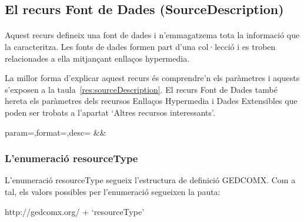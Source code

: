\subsection{El recurs Font de Dades (SourceDescription)}

    \paragraph{}
    Aquest recurs defineix una font de dades i n'emmagatzema tota la informació que la caracteritza. Les fonts de dades formen part d'una col·lecció i es troben relacionades a ella mitjançant enllaços hypermedia.

    La millor forma d'explicar aquest recurs és comprendre'n els paràmetres i aquests s'exposen a la taula~\ref{res:sourceDescription}. El recurs Font de Dades també hereta els paràmetres dels recursos Enllaços Hypermedia i Dades Extensibles que poden ser trobats a l'apartat `Altres recursos interessants'.

    \begin{center}
             {param=\param,format=\format,desc=\desc}
             {\param&\format&\desc}
     \end{center}


    \subsubsection{L'enumeració resourceType}

    L'enumeració resourceType segueix l'estructura de definició GEDCOMX. Com a tal, els valors possibles per l'enumeració segueixen la pauta:

    http://gedcomx.org/ + `resourceType'

